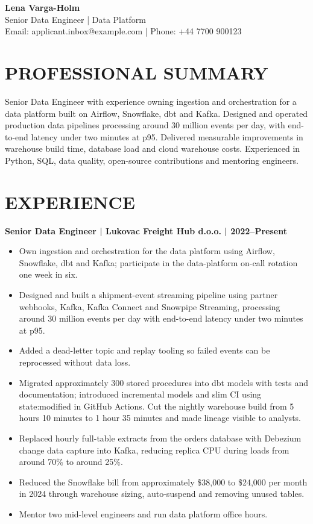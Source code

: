 \documentclass[11pt,a4paper]{article}
\begin{document}
\begin{center}
{\LARGE\bfseries\color{primarycolor} Lena Varga-Holm}\\
{\large Senior Data Engineer | Data Platform}\\[0.25em]
Email: applicant.inbox@example.com | Phone: +44 7700 900123
\end{center}

\section*{PROFESSIONAL SUMMARY}
Senior Data Engineer with experience owning ingestion and orchestration for a data platform built on Airflow, Snowflake, dbt and Kafka. Designed and operated production data pipelines processing around 30 million events per day, with end-to-end latency under two minutes at p95. Delivered measurable improvements in warehouse build time, database load and cloud warehouse costs. Experienced in Python, SQL, data quality, open-source contributions and mentoring engineers.

\section*{EXPERIENCE}
\textbf{Senior Data Engineer | Lukovac Freight Hub d.o.o. | 2022--Present}
\begin{itemize}
\item Own ingestion and orchestration for the data platform using Airflow, Snowflake, dbt and Kafka; participate in the data-platform on-call rotation one week in six.
\item Designed and built a shipment-event streaming pipeline using partner webhooks, Kafka, Kafka Connect and Snowpipe Streaming, processing around 30 million events per day with end-to-end latency under two minutes at p95.
\item Added a dead-letter topic and replay tooling so failed events can be reprocessed without data loss.
\item Migrated approximately 300 stored procedures into dbt models with tests and documentation; introduced incremental models and slim CI using state:modified in GitHub Actions. Cut the nightly warehouse build from 5 hours 10 minutes to 1 hour 35 minutes and made lineage visible to analysts.
\item Replaced hourly full-table extracts from the orders database with Debezium change data capture into Kafka, reducing replica CPU during loads from around 70\% to around 25\%.
\item Reduced the Snowflake bill from approximately \$38,000 to \$24,000 per month in 2024 through warehouse sizing, auto-suspend and removing unused tables.
\item Mentor two mid-level engineers and run data platform office hours.
\end{itemize}
\end{document}
